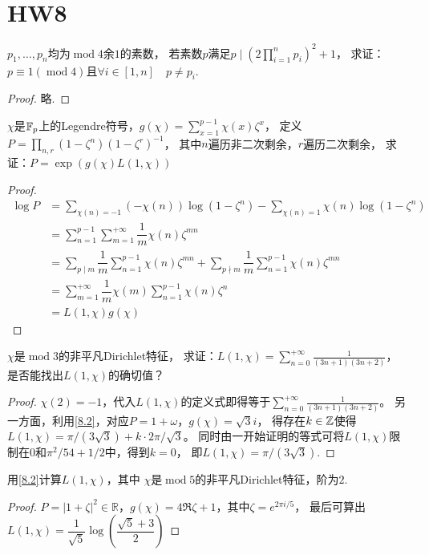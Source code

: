 \section{HW8}
\begin{exercise}
    $p_1,\ldots,p_n$均为$\operatorname{mod}4$余$1$的素数，
    若素数$p$满足$p\mid \left( 
    2\prod_{i=1}^np_i
     \right)^2+1$，
    求证：$p\equiv1(\operatorname{mod}4)$且$\forall i \in [1,n]\quad p\neq p_i$.
\end{exercise}
\begin{proof}
    略.
\end{proof}

\begin{exercise}\label{8.2}
$\chi$是$\mathbb{F}_p$上的Legendre符号，$g(\chi)=\sum_{x=1}^{p-1}\chi(x)\zeta^x$，
定义$P=\prod_{n,r}(1-\zeta^n)(1-\zeta^r)^{-1}$，
其中$n$遍历非二次剩余，$r$遍历二次剩余，
求证：$P=\exp(g(\chi)L(1,\chi))$
\end{exercise}
\begin{proof}
    \begin{align*}
\log P&=\sum_{\chi(n)=-1}(-\chi(n))\log(1-\zeta^n)-\sum_{\chi(n)=1}\chi(n)\log(1-\zeta^n)\\
&=\sum_{n=1}^{p-1}\sum_{m=1}^{+\infty}\dfrac{1}{m}\chi(n)\zeta^{mn}\\
&=\sum_{p\mid m}\dfrac{1}{m}\sum_{n=1}^{p-1}\chi(n)\zeta^{mn}
+\sum_{p\nmid m}\dfrac{1}{m}\sum_{n=1}^{p-1}\chi(n)\zeta^{mn}\\
&=\sum_{m=1}^{+\infty}\dfrac{1}{m}\chi(m)\sum_{n=1}^{p-1}\chi(n)\zeta^{n}\\
&=L(1,\chi)g(\chi)
    \end{align*}
\end{proof}

\begin{exercise}
    $\chi$是$\operatorname{mod}3$的非平凡Dirichlet特征，
    求证：$\displaystyle L(1,\chi)=\sum_{n=0}^{+\infty}\frac{1}{(3n+1)(3n+2)}$，
    是否能找出$L(1,\chi)$的确切值？
\end{exercise}
\begin{proof}
    $\chi(2)=-1$，代入$L(1,\chi)$的定义式即得等于$\displaystyle\sum_{n=0}^{+\infty}\frac{1}{(3n+1)(3n+2)}$。
    另一方面，利用\ref{8.2}，对应$P=1+\omega$，$g(\chi)=\sqrt{3}i$，
    得存在$k\in\mathbb{Z}$使得$L(1,\chi)=\pi/(3\sqrt{3})+k\cdot2\pi/\sqrt{3}$。
    同时由一开始证明的等式可将$L(1,\chi)$限制在$0$和$\pi^2/54+1/2$中，得到$k=0$，
    即$L(1,\chi)=\pi/(3\sqrt{3})$.
\end{proof}

\begin{exercise}
    用\ref{8.2}计算$L(1,\chi)$，其中
    $\chi$是$\operatorname{mod}5$的非平凡Dirichlet特征，阶为$2$.
\end{exercise}
\begin{proof}
    $P=|1+\zeta|^2\in\mathbb{R}$，$g(\chi)=4\Re\zeta+1$，其中$\zeta=e^{2\pi i/5}$，
    最后可算出$L(1,\chi)=\dfrac{1}{\sqrt{5}}\log\left( \dfrac{\sqrt{5}+3}{2} \right)$
\end{proof}


